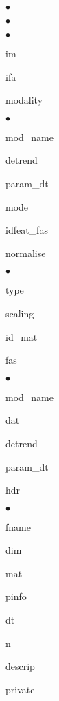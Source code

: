 \begin{list}{$\bullet$}
\begin{list}{$\bullet$}
\begin{list}{$\bullet$}
            {\setlength{\labelsep}{.2cm}\setlength{\itemindent}{0cm}\setlength{\leftmargin}{1.2cm}}
        \item im
        \item ifa
        \end{list}
    \item modality
        \begin{list}{$\bullet$}
            {\setlength{\labelsep}{.2cm}\setlength{\itemindent}{0cm}\setlength{\leftmargin}{1.2cm}}
        \item mod\_name
        \item detrend
        \item param\_dt
        \item mode
        \item idfeat\_fas
        \item normalise
            \begin{list}{$\bullet$}
                {\setlength{\labelsep}{.2cm}\setlength{\itemindent}{0cm}\setlength{\leftmargin}{1.7cm}}
            \item type
            \item scaling
            \end{list}
        \end{list}
    \item id\_mat
    \end{list}
\item fas
    \begin{list}{$\bullet$}
        {\setlength{\labelsep}{.2cm}\setlength{\itemindent}{0cm}\setlength{\leftmargin}{0.7cm}}
    \item mod\_name
    \item dat
    \item detrend
    \item param\_dt
    \item hdr
        \begin{list}{$\bullet$}
            {\setlength{\labelsep}{.2cm}\setlength{\itemindent}{0cm}\setlength{\leftmargin}{1.2cm}}
        \item fname
        \item dim
        \item mat
        \item pinfo
        \item dt
        \item n
        \item descrip
        \item private
        \end{list}

\end{list}
\end{list}
